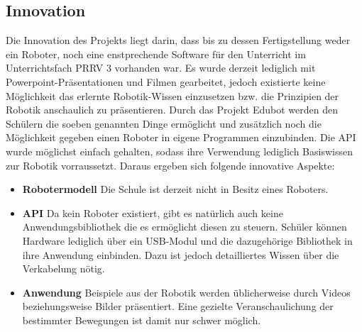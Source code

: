 \subsection{Innovation}
Die Innovation des Projekts liegt darin, dass bis zu dessen Fertigstellung weder ein Roboter, noch eine enstprechende Software für den Unterricht im Unterrichtsfach PRRV 3 vorhanden war. Es wurde derzeit lediglich mit Powerpoint-Präsentationen und Filmen gearbeitet, jedoch existierte keine Möglichkeit das erlernte Robotik-Wissen einzusetzen bzw. die Prinzipien der Robotik anschaulich zu präsentieren. 
\newline
Durch das Projekt Edubot werden den Schülern die soeben genannten Dinge ermöglicht und zusätzlich noch die Möglichkeit gegeben einen Roboter in eigene Programmen einzubinden. Die API wurde möglichst einfach gehalten, sodass ihre Verwendung lediglich Basiswissen zur Robotik vorraussetzt.
Daraus ergeben sich folgende innovative Aspekte:
\begin{itemize}
\item \textbf{Robotermodell}
\newline
Die Schule ist derzeit nicht in Besitz eines Roboters.
\item \textbf{API}
\newline
Da kein Roboter existiert, gibt es natürlich auch keine Anwendungsbibliothek die es ermöglicht diesen zu steuern. Schüler können Hardware lediglich über ein USB-Modul und die dazugehörige Bibliothek in ihre Anwendung einbinden. Dazu ist jedoch detailliertes Wissen über die Verkabelung nötig.
\item \textbf{Anwendung}
Beispiele aus der Robotik werden üblicherweise durch Videos beziehungsweise Bilder präsentiert. Eine gezielte Veranschaulichung der bestimmter Bewegungen ist damit nur schwer möglich.
\end{itemize}
